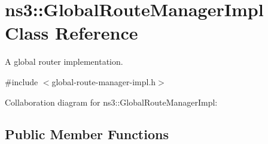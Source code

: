\hypertarget{classns3_1_1GlobalRouteManagerImpl}{}\section{ns3\+:\+:Global\+Route\+Manager\+Impl Class Reference}
\label{classns3_1_1GlobalRouteManagerImpl}


A global router implementation.  




{\ttfamily \#include $<$global-\/route-\/manager-\/impl.\+h$>$}



Collaboration diagram for ns3\+:\+:Global\+Route\+Manager\+Impl\+:
\subsection*{Public Member Functions}
